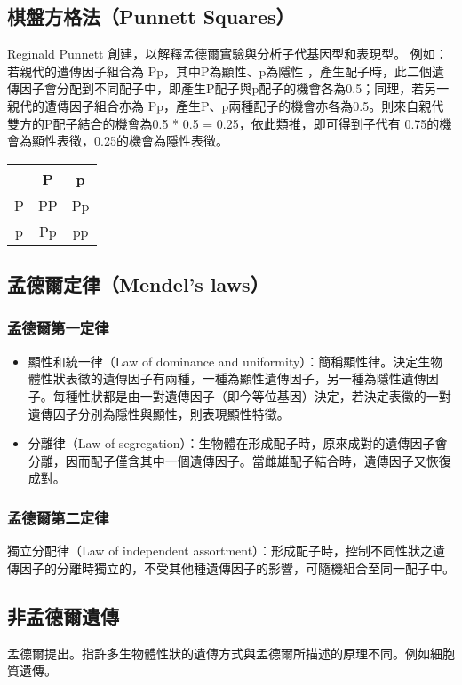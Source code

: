 \documentclass[a4paper,12pt]{report}
\begin{document}
\subsection{棋盤方格法（Punnett Squares）}
Reginald Punnett 創建，以解釋孟德爾實驗與分析子代基因型和表現型。 例如：若親代的遭傳因子組合為 Pp，其中P為顯性、p為隱性 ，產生配子時，此二個遺傳因子會分配到不同配子中，即產生P配子與p配子的機會各為0.5；同理，若另一親代的遭傳因子組合亦為 Pp，產生P、p兩種配子的機會亦各為0.5。則來自親代雙方的P配子結合的機會為0.5 * 0.5 = 0.25，依此類推，即可得到子代有 0.75的機會為顯性表徵，0.25的機會為隱性表徵。
\begin{center}
\begin{tabular}{|c|c|c|}
\hline
& P & p \\ \hline
P & PP & Pp \\ \hline
p & Pp & pp \\ \hline
\end{tabular}
\end{center}
\subsection{孟德爾定律（Mendel's laws）}
\subsubsection{孟德爾第一定律}
\begin{itemize}
\item 顯性和統一律（Law of dominance and uniformity）：簡稱顯性律。決定生物體性狀表徵的遺傳因子有兩種，一種為顯性遺傳因子，另一種為隱性遺傳因子。每種性狀都是由一對遺傳因子（即今等位基因）決定，若決定表徵的一對遺傳因子分別為隱性與顯性，則表現顯性特徵。
\item 分離律（Law of segregation）：生物體在形成配子時，原來成對的遺傳因子會分離，因而配子僅含其中一個遺傳因子。當雌雄配子結合時，遺傳因子又恢復成對。
\end{itemize}
\subsubsection{孟德爾第二定律}
獨立分配律（Law of independent assortment）：形成配子時，控制不同性狀之遺傳因子的分離時獨立的，不受其他種遺傳因子的影響，可隨機組合至同一配子中。
\subsection{非孟德爾遺傳}
孟德爾提出。指許多生物體性狀的遺傳方式與孟德爾所描述的原理不同。例如細胞質遺傳。
\end{document}
